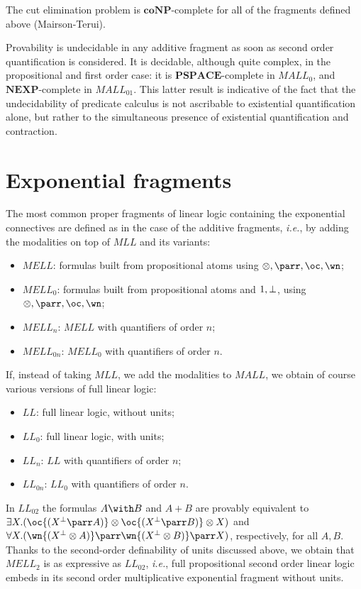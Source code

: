 The cut elimination problem is \(\mathbf{coNP}\)-complete for all of the
fragments defined above (Mairson-Terui).

Provability is undecidable in any additive fragment as soon as second
order quantification is considered. It is decidable, although quite
complex, in the propositional and first order case: it is
\(\mathbf{PSPACE}\)-complete in \(MALL_0\), and
\(\mathbf{NEXP}\)-complete in \(MALL_{01}\). This latter result is
indicative of the fact that the undecidability of predicate calculus is
not ascribable to existential quantification alone, but rather to the
simultaneous presence of existential quantification and contraction.

\section{Exponential fragments}\label{exponential-fragments}

The most common proper fragments of linear logic containing the
exponential connectives are defined as in the case of the additive
fragments, \emph{i.e.}, by adding the modalities on top of \(MLL\) and
its variants:

\begin{itemize}
\tightlist
\item
  \(MELL\): formulas built from propositional atoms using
  \(\tens,\parr,\oc,\wn\);
\item
  \(MELL_0\): formulas built from propositional atoms and \(1,\bot\),
  using \(\tens,\parr,\oc,\wn\);
\item
  \(MELL_n\): \(MELL\) with quantifiers of order \(n\);
\item
  \(MELL_{0n}\): \(MELL_0\) with quantifiers of order \(n\).
\end{itemize}

If, instead of taking \(MLL\), we add the modalities to \(MALL\), we
obtain of course various versions of full linear logic:

\begin{itemize}
\tightlist
\item
  \(LL\): full linear logic, without units;
\item
  \(LL_0\): full linear logic, with units;
\item
  \(LL_n\): \(LL\) with quantifiers of order \(n\);
\item
  \(LL_{0n}\): \(LL_0\) with quantifiers of order \(n\).
\end{itemize}

In \(LL_{02}\) the formulas \(A\with B\) and \(A\plus B\) are provably
equivalent to
\(\exists X.(\oc{(X\orth\parr A)}\tens\oc{(X\orth\parr B)}\tens X)\) and
\(\forall X.(\wn{(X\orth\tens A)}\parr\wn{(X\orth \tens B)}\parr X)\),
respectively, for all \(A,B\). Thanks to the second-order definability
of units discussed above, we obtain that \(MELL_2\) is as expressive as
\(LL_{02}\), \emph{i.e.}, full propositional second order linear logic
embeds in its second order multiplicative exponential fragment without
units.

